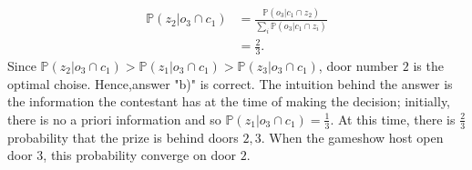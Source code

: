 \begin{example}
	\begin{equation}
		\begin{split}
			\mathbb{P}(z_2|o_3 \cap c_1) &= \frac{\mathbb{P}(o_3|c_1 \cap z_2)}{\sum_i\mathbb{P}(o_3|c_1 \cap z_i)}\\
			&=\frac{2}{3}.
		\end{split}
	\end{equation}
	Since $\mathbb{P}(z_2|o_3 \cap c_1)>\mathbb{P}(z_1|o_3 \cap c_1)>\mathbb{P}(z_3|o_3 \cap c_1)$, door number $2$ is the optimal choise. Hence,answer "b)" is correct. The intuition behind the answer is the information the contestant has at the time of making the decision; initially, there is no a priori information and so $\mathbb{P}(z_1|o_3 \cap c_1)=\frac{1}{3}$. At this time, there is $\frac{2}{3}$ probability that the prize is behind doors $2,3$. When the gameshow host open door $3$, this probability converge on door $2$.
\end{example}

